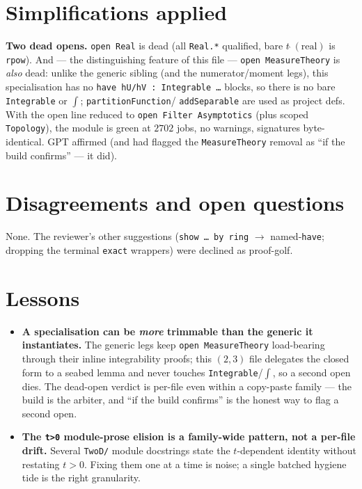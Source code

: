 \documentclass[11pt]{article}
\begin{document}
\section{Simplifications applied}
\textbf{Two dead opens.} \texttt{open Real} is dead (all \texttt{Real.*} qualified, bare
$t\,\hat{}\,(\text{real})$ is \texttt{rpow}). And --- the distinguishing feature of this file ---
\texttt{open MeasureTheory} is \emph{also} dead: unlike the generic sibling (and the
numerator/moment legs), this specialisation has no \texttt{have hU/hV : Integrable \dots} blocks, so
there is no bare \texttt{Integrable} or \texttt{$\int$}; \texttt{partitionFunction}/%
\texttt{addSeparable} are used as project defs. With the open line reduced to
\texttt{open Filter Asymptotics} (plus scoped \texttt{Topology}), the module is green at $2702$
jobs, no warnings, signatures byte-identical. GPT affirmed (and had flagged the
\texttt{MeasureTheory} removal as ``if the build confirms'' --- it did).

\section{Disagreements and open questions}
None. The reviewer's other suggestions (\texttt{show \dots\ by ring} $\to$ named-\texttt{have};
dropping the terminal \texttt{exact} wrappers) were declined as proof-golf.

\section{Lessons}
\begin{itemize}[noitemsep]
  \item \textbf{A specialisation can be \emph{more} trimmable than the generic it instantiates.} The
    generic legs keep \texttt{open MeasureTheory} load-bearing through their inline integrability
    proofs; this $(2,3)$ file delegates the closed form to a seabed lemma and never touches
    \texttt{Integrable}/\texttt{$\int$}, so a second open dies. The dead-open verdict is per-file
    even within a copy-paste family --- the build is the arbiter, and ``if the build confirms'' is
    the honest way to flag a second open.
  \item \textbf{The \texttt{t>0} module-prose elision is a family-wide pattern, not a per-file
    drift.} Several \texttt{TwoD/} module docstrings state the $t$-dependent identity without
    restating $t>0$. Fixing them one at a time is noise; a single batched hygiene tide is the right
    granularity.
\end{itemize}
\end{document}
